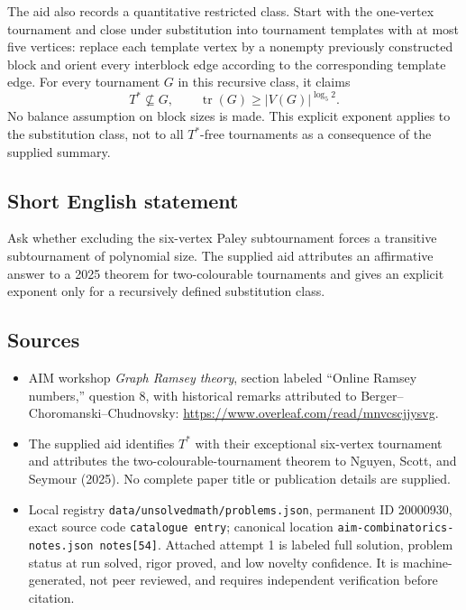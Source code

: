 \documentclass[11pt]{article}
\begin{document}
The aid also records a quantitative restricted class. Start with the one-vertex tournament and close under substitution into tournament templates with at most five vertices: replace each template vertex by a nonempty previously constructed block and orient every interblock edge according to the corresponding template edge. For every tournament $G$ in this recursive class, it claims
\[
 T^*\not\subseteq G,\qquad
 \operatorname{tr}(G)\geq |V(G)|^{\log_5 2}.
\]
No balance assumption on block sizes is made. This explicit exponent applies to the substitution class, not to all $T^*$-free tournaments as a consequence of the supplied summary.
\subsection{Short English statement}
Ask whether excluding the six-vertex Paley subtournament forces a transitive subtournament of polynomial size. The supplied aid attributes an affirmative answer to a 2025 theorem for two-colourable tournaments and gives an explicit exponent only for a recursively defined substitution class.
\subsection{Sources}
\begin{itemize}
\item AIM workshop \emph{Graph Ramsey theory}, section labeled ``Online Ramsey numbers,'' question 8, with historical remarks attributed to Berger--Choromanski--Chudnovsky: \url{https://www.overleaf.com/read/mnvcscjjysvg}.
\item The supplied aid identifies $T^*$ with their exceptional six-vertex tournament and attributes the two-colourable-tournament theorem to Nguyen, Scott, and Seymour (2025). No complete paper title or publication details are supplied.
\item Local registry \texttt{data/unsolvedmath/problems.json}, permanent ID 20000930, exact source code \texttt{catalogue entry}; canonical location \texttt{aim-combinatorics-notes.json notes[54]}. Attached attempt 1 is labeled full solution, problem status at run solved, rigor proved, and low novelty confidence. It is machine-generated, not peer reviewed, and requires independent verification before citation.
\end{itemize}
\end{document}
